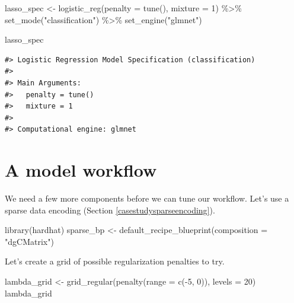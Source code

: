 \documentclass[
]{krantz}
\makeatletter
\newenvironment{Shaded}{\begin{snugshade}}{\end{snugshade}}
\newcommand{\AttributeTok}[1]{\textcolor[rgb]{0.77,0.63,0.00}{#1}}
\newcommand{\DecValTok}[1]{\textcolor[rgb]{0.00,0.00,0.81}{#1}}
\newcommand{\FunctionTok}[1]{\textcolor[rgb]{0.00,0.00,0.00}{#1}}
\newcommand{\NormalTok}[1]{#1}
\newcommand{\OtherTok}[1]{\textcolor[rgb]{0.56,0.35,0.01}{#1}}
\newcommand{\SpecialCharTok}[1]{\textcolor[rgb]{0.00,0.00,0.00}{#1}}
\newcommand{\StringTok}[1]{\textcolor[rgb]{0.31,0.60,0.02}{#1}}
\newenvironment{kframe}{%
\medskip{}
\setlength{\fboxsep}{.8em}
 \def\at@end@of@kframe{}%
 \ifinner\ifhmode%
  \def\at@end@of@kframe{\end{minipage}}%
  \begin{minipage}{\columnwidth}%
 \fi\fi%
 \def\FrameCommand##1{\hskip\@totalleftmargin \hskip-\fboxsep
 \colorbox{shadecolor}{##1}\hskip-\fboxsep
     \hskip-\linewidth \hskip-\@totalleftmargin \hskip\columnwidth}%
 \MakeFramed {\advance\hsize-\width
   \@totalleftmargin\z@ \linewidth\hsize
   \@setminipage}}%
 {\par\unskip\endMakeFramed%
 \at@end@of@kframe}
\renewenvironment{Shaded}{\begin{kframe}}{\end{kframe}}
\makeatother
\begin{document}
\begin{Shaded}
\begin{Highlighting}[]
\NormalTok{lasso\_spec }\OtherTok{\textless{}{-}} \FunctionTok{logistic\_reg}\NormalTok{(}\AttributeTok{penalty =} \FunctionTok{tune}\NormalTok{(), }\AttributeTok{mixture =} \DecValTok{1}\NormalTok{) }\SpecialCharTok{\%\textgreater{}\%}
  \FunctionTok{set\_mode}\NormalTok{(}\StringTok{"classification"}\NormalTok{) }\SpecialCharTok{\%\textgreater{}\%}
  \FunctionTok{set\_engine}\NormalTok{(}\StringTok{"glmnet"}\NormalTok{)}

\NormalTok{lasso\_spec}
\end{Highlighting}
\end{Shaded}

\begin{verbatim}
#> Logistic Regression Model Specification (classification)
#> 
#> Main Arguments:
#>   penalty = tune()
#>   mixture = 1
#> 
#> Computational engine: glmnet
\end{verbatim}

\hypertarget{a-model-workflow}{%
\section{A model workflow}\label{a-model-workflow}}

We need a few more components before we can tune our workflow. Let's use a sparse data encoding (Section \ref{casestudysparseencoding}).

\begin{Shaded}
\begin{Highlighting}[]
\FunctionTok{library}\NormalTok{(hardhat)}
\NormalTok{sparse\_bp }\OtherTok{\textless{}{-}} \FunctionTok{default\_recipe\_blueprint}\NormalTok{(}\AttributeTok{composition =} \StringTok{"dgCMatrix"}\NormalTok{)}
\end{Highlighting}
\end{Shaded}

Let's create a grid of possible regularization penalties to try.

\begin{Shaded}
\begin{Highlighting}[]
\NormalTok{lambda\_grid }\OtherTok{\textless{}{-}} \FunctionTok{grid\_regular}\NormalTok{(}\FunctionTok{penalty}\NormalTok{(}\AttributeTok{range =} \FunctionTok{c}\NormalTok{(}\SpecialCharTok{{-}}\DecValTok{5}\NormalTok{, }\DecValTok{0}\NormalTok{)), }\AttributeTok{levels =} \DecValTok{20}\NormalTok{)}
\NormalTok{lambda\_grid}
\end{Highlighting}
\end{Shaded}
\end{document}
